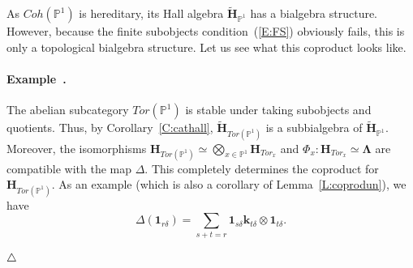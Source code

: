 \documentclass[a4paper,10pt]{amsart}
\def\H{\mathbf{H}}
\def\endexample{$\hfill \triangle$}
\def\LLambda{\boldsymbol{\Lambda}}
\numberwithin{equation}{section}
\begin{document}
{\vspace{.15in}

As $Coh(\mathbb{P}^1)$ is hereditary, its Hall algebra $\widetilde{\H}_{\mathbb{P}^1}$ has a bialgebra structure. However, because the finite subobjects condition~(\ref{E:FS}) obviously fails, this is only a topological bialgebra structure. Let us see what this coproduct looks like.

\vspace{.15in}

\addtocounter{theo}{1}
\paragraph{\textbf{Example~\thetheo.}} The abelian subcategory $Tor({\mathbb{P}^1})$ is stable under taking subobjects and quotients. Thus, by Corollary~\ref{C:cathall}, $\widetilde{\H}_{Tor({\mathbb{P}^1})}$ is a subbialgebra of $\widetilde{\H}_{\mathbb{P}^1}$. Moreover, the isomorphisms $\H_{Tor({\mathbb{P}^1})}\simeq
\bigotimes_{x \in \mathbb{P}^1} \H_{Tor_x}$ and $\Phi_x: \H_{Tor_x} \simeq \LLambda$ are compatible with the map $\Delta$. This completely determines the coproduct for $\H_{Tor(\mathbb{P}^1)}$. As an example (which is also a corollary of Lemma~\ref{L:coprodun}), we have
\begin{equation}\label{E:coprod1rd}
{\Delta}(\mathbf{1}_{r\delta})=\sum_{s+t=r} \mathbf{1}_{s\delta}\mathbf{k}_{t\delta}\otimes \mathbf{1}_{t\delta}.
\end{equation}

\endexample

\vspace{.15in}

\addtocounter{theo}{1}
}
\end{document}
